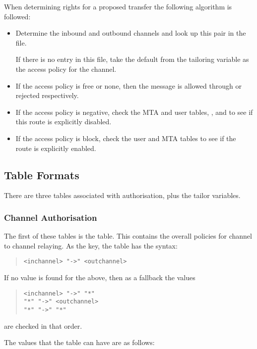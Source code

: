 When determining rights for a proposed transfer  the following
algorithm is followed:
\begin{itemize}
\item	Determine the inbound and outbound channels and look up
this pair in the  file.

If there is no entry in this file, take the default from the tailoring
variable as the access policy for the channel.

\item	If the access policy is free or none, then the message is
allowed through or rejected respectively.

\item	If the access policy is negative, check the MTA and user
tables, , and  to see if this route is
explicitly disabled.

\item	If the access policy is block, check the user and MTA tables
to see if the route is explicitly enabled.
\end{itemize}

\subsection{Table Formats}
There are three tables associated with authorisation, plus the tailor
variables.

\subsubsection{Channel Authorisation}
The first of these tables is the  table.
This contains the overall policies for channel to channel relaying.
As the key, the table has the syntax: 

\begin{quote}\small\begin{verbatim}
<inchannel> "->" <outchannel>
\end{verbatim}\end{quote}

If no value is found for the above, then as a fallback the values
\begin{quote}\small\begin{verbatim}
<inchannel> "->" "*"
"*" "->" <outchannel>
"*" "->" "*"
\end{verbatim}\end{quote}
are checked in that order.

The values that the table can have are as follows:

